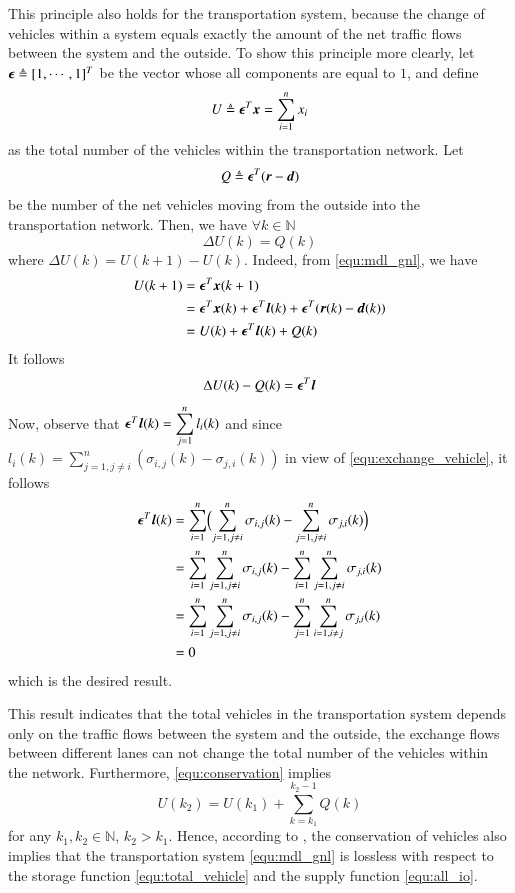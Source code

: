 \documentclass[preprint,authoryear,12pt]{elsarticle}
\renewcommand{\vec}[1]{\mbox{\boldmath$#1$}}
\begin{document}
This principle also holds for the transportation system, because the
change of vehicles within a system equals exactly the amount of the
net traffic flows between the system and the outside. To show this
principle more clearly, 
let $\vec{\epsilon} \triangleq [1,\cdots,1]^T$ be the vector whose
all components are equal to $1$, and define
\begin{equation}\label{equ:total_vehicle}
U \triangleq \vec{\epsilon}^T\vec{x}=\sum_{i=1}^n x_i
\end{equation}
as the total number of the vehicles within the transportation
network. Let
\begin{equation}\label{equ:all_io}
Q \triangleq \vec{\epsilon}^T(\vec{r}-\vec{d})
\end{equation}
be the number of the net vehicles moving from the outside into the
transportation network. Then, we have $\forall k\in\mathbb{N}$
\begin{equation}\label{equ:conservation}
\Delta U(k) = Q(k)
\end{equation}
where $\Delta U(k)=U(k+1)-U(k)$.
Indeed, from \eqref{equ:mdl_gnl}, we have
\begin{align*}
U(k+1) &= \vec{\epsilon}^T\vec{x}(k+1)\\
       &=
\vec{\epsilon}^T\vec{x}(k)+\vec{\epsilon}^T\vec{l}(k)
+\vec{\epsilon}^T(\vec{r}(k)-\vec{d}(k))\\
       &= U(k)+\vec{\epsilon}^T\vec{l}(k)+Q(k)
\end{align*}
It follows
$$\Delta U(k)-Q(k) = \vec{\epsilon}^T\vec{l}$$
Now, observe that $\vec{\epsilon}^T\vec{l}(k) =\displaystyle
\sum_{j=1}^{n} l_i(k)$ and since $l_i(k)=\displaystyle\sum_{j=1,j\neq
i}^{n}(\sigma_{i,j}(k)-\sigma_{j,i}(k))$ in view of
\eqref{equ:exchange_vehicle}, it follows
\begin{align*}
\vec{\epsilon}^T\vec{l}(k)
    &= \sum_{i=1}^n \Bigl(\sum_{j=1,j\neq i}^{n} \sigma_{i,j}(k)
       -\sum_{j=1,j\neq i}^{n} \sigma_{j,i}(k)\Bigr)\\
    &= \sum_{i=1}^n \sum_{j=1,j\neq i}^{n} \sigma_{i,j}(k)
       -\sum_{i=1}^n \sum_{j=1,j\neq i}^{n} \sigma_{j,i}(k)\\
    &= \sum_{i=1}^n \sum_{j=1,j\neq i}^{n} \sigma_{i,j}(k)
       -\sum_{j=1}^n \sum_{i=1,i\neq j}^{n} \sigma_{j,i}(k)\\
    &= 0
\end{align*}
which is the desired result.

This result indicates that the total vehicles in the transportation
system depends only on the traffic flows between the system and the
outside, the exchange flows between different lanes can not change
the total number of the vehicles within the network. Furthermore,
\eqref{equ:conservation} implies
\begin{equation}\label{equ:conservation_ex}
U(k_2) = U(k_1)+\sum_{k=k_1}^{k_2-1}Q(k)
\end{equation}
for any $k_1,k_2\in\mathbb{N}$, $k_2>k_1$. Hence, according to
\citep{willems_dissipative_1972-1}, the conservation of vehicles also
implies that the transportation system \eqref{equ:mdl_gnl} is
lossless with respect to the storage function
\eqref{equ:total_vehicle} and the supply function \eqref{equ:all_io}.
\end{document}
